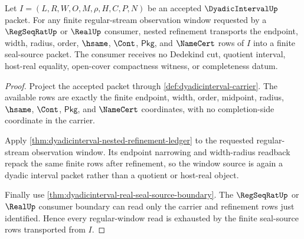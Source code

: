 \begin{theorem}
\label{thm:dyadicinterval-regular-window-seal-handoff}
Let $I=(L,R,W,O,M,\rho,H,C,P,N)$ be an accepted
$\DyadicIntervalUp$ packet. For any finite regular-stream observation window
requested by a $\RegSeqRatUp$ or $\RealUp$ consumer, nested refinement
transports the endpoint, width, radius, order, $\hsame$, $\Cont$,
$\mathsf{Pkg}$, and $\NameCert$ rows of $I$ into a finite seal-source packet.
The consumer receives no Dedekind cut, quotient interval, host-real equality,
open-cover compactness witness, or completeness datum.
\end{theorem}
\begin{proof}
Project the accepted packet through \autoref{def:dyadicinterval-carrier}.
The available rows are exactly the finite endpoint, width, order, midpoint,
radius, $\hsame$, $\Cont$, $\mathsf{Pkg}$, and $\NameCert$ coordinates, with
no completion-side coordinate in the carrier.

Apply \autoref{thm:dyadicinterval-nested-refinement-ledger} to the requested
regular-stream observation window. Its endpoint narrowing and width-radius
readback repack the same finite rows after refinement, so the window source is
again a dyadic interval packet rather than a quotient or host-real object.

Finally use \autoref{thm:dyadicinterval-real-seal-source-boundary}. The
$\RegSeqRatUp$ or $\RealUp$ consumer boundary can read only the carrier and
refinement rows just identified. Hence every regular-window read is exhausted
by the finite seal-source rows transported from $I$.
\end{proof}

